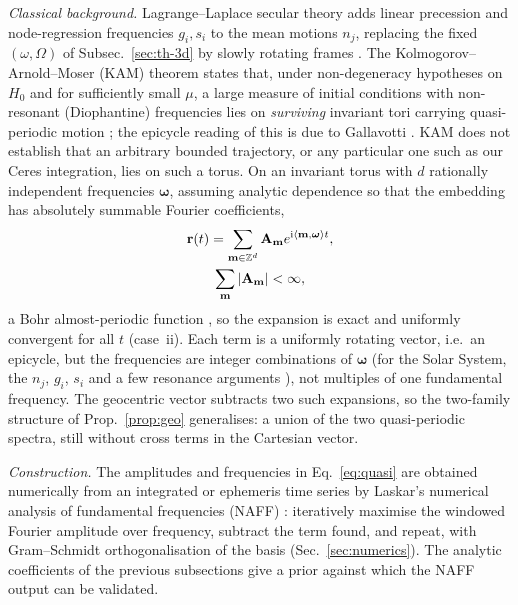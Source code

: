 \emph{Classical background.} Lagrange--Laplace secular theory adds linear
precession and node-regression frequencies $g_i,s_i$ to the mean motions $n_j$,
replacing the fixed $(\omega,\Omega)$ of Subsec.~\ref{sec:th-3d} by slowly
rotating frames \cite{MurrayDermott1999,BrouwerClemence1961}. The
Kolmogorov--Arnold--Moser (KAM) theorem states that, under non-degeneracy
hypotheses on $H_0$ and for sufficiently small $\mu$, a large measure of
initial conditions with non-resonant (Diophantine) frequencies lies on
\emph{surviving} invariant tori carrying quasi-periodic motion
\cite{Arnold1963a,Arnold1963b,Arnold1989}; the epicycle reading of this is due
to Gallavotti \cite{Gallavotti2001}. KAM does not establish that an arbitrary
bounded trajectory, or any particular one such as our Ceres integration, lies on
such a torus. On an invariant torus with $d$
rationally independent frequencies $\boldsymbol\omega$, assuming analytic
dependence so that the embedding has absolutely summable Fourier coefficients,
\begin{gather}
\mathbf r(t)=\sum_{\mathbf m\in\mathbb Z^d}\mathbf A_{\mathbf m}e^{\mathrm{i}\langle\mathbf m,\boldsymbol\omega\rangle t},\notag\\
\sum_{\mathbf m}|\mathbf A_{\mathbf m}|<\infty,
\label{eq:quasi}
\end{gather}
a Bohr almost-periodic function \cite{Bohr1925,Laskar1993,Laskar2003}, so the
expansion is exact and uniformly convergent for all $t$ (case~ii). Each
term is a uniformly rotating vector, i.e.\ an epicycle, but the frequencies are
integer combinations of $\boldsymbol\omega$ (for the Solar System, the $n_j$,
$g_i$, $s_i$ and a few resonance arguments \cite{Laskar1990,Laskar2003}), not
multiples of one fundamental frequency. The geocentric vector subtracts two
such expansions, so the two-family structure of Prop.~\ref{prop:geo}
generalises: a union of the two quasi-periodic spectra, still without cross
terms in the Cartesian vector.

\emph{Construction.} The amplitudes and frequencies in Eq.~\eqref{eq:quasi}
are obtained numerically from an integrated or ephemeris time series by
Laskar's numerical analysis of fundamental frequencies (NAFF)
\cite{Laskar1990,Laskar1992,Laskar1993,Laskar1999}: iteratively maximise the
windowed Fourier amplitude over frequency, subtract the term found, and
repeat, with Gram--Schmidt orthogonalisation of the basis (Sec.~\ref{sec:numerics}).
The analytic coefficients of the previous subsections give a prior against which
the NAFF output can be validated.

